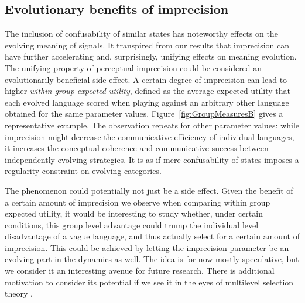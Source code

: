 \documentclass[fleqn,reqno,10pt]{article}
\begin{document}

\subsection{Evolutionary benefits of imprecision}
The inclusion of confusability of similar states has noteworthy effects on the evolving meaning
of signals.  It transpired from our results that imprecision can have further accelerating and,
surprisingly, unifying effects on meaning evolution.  The unifying property of perceptual
imprecision could be considered an evolutionarily beneficial side-effect. A certain degree of
imprecision can lead to higher \emph{within group expected utility}, defined as the average
expected utility that each evolved language scored when playing against an arbitrary other
language obtained for the same parameter values. Figure~\ref{fig:GroupMeasuresB} gives a
representative example. The observation repeats for other parameter values: while imprecision
might decrease the communicative efficiency of individual languages, it increases the
conceptual coherence and communicative success between independently evolving strategies. It is
as if mere confusability of states imposes a regularity constraint on evolving categories.

The phenomenon could potentially not just be a side effect.  Given the benefit of a certain
amount of imprecision we observe when comparing within group expected utility, it would be
interesting to study whether, under certain conditions, this group level advantage could trump
the individual level disadvantage of a vague language, and thus actually select for a certain
amount of imprecision.  This could be achieved by letting the imprecision parameter be an
evolving part in the dynamics as well. The idea is for now mostly speculative, but we consider
it an interesting avenue for future research.  There is additional motivation to consider its
potential if we see it in the eyes of multilevel selection theory
\citep{Wilson1994,OGorman2008}.
\end{document}
